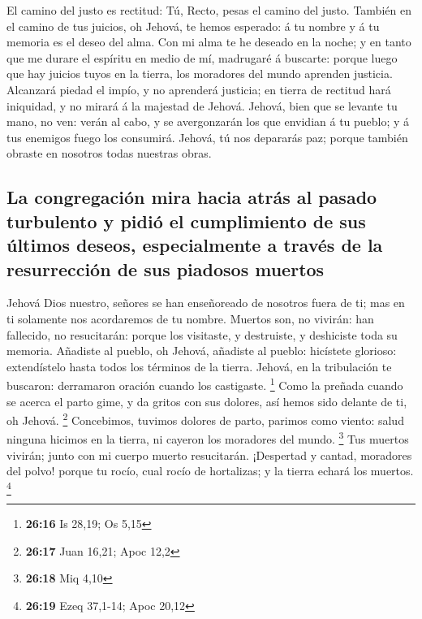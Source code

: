  El camino del justo es rectitud: Tú, Recto, pesas el
camino del justo.  También en el camino de tus juicios, oh
Jehová, te hemos esperado: á tu nombre y á tu memoria es el deseo del
alma.  Con mi alma te he deseado en la noche; y en tanto
que me durare el espíritu en medio de mí, madrugaré á buscarte: porque
luego que hay juicios tuyos en la tierra, los moradores del mundo
aprenden justicia.  Alcanzará piedad el impío, y no
aprenderá justicia; en tierra de rectitud hará iniquidad, y no mirará á
la majestad de Jehová.  Jehová, bien que se levante tu
mano, no ven: verán al cabo, y se avergonzarán los que envidian á tu
pueblo; y á tus enemigos fuego los consumirá.  Jehová, tú
nos depararás paz; porque también obraste en nosotros todas nuestras
obras.

\hypertarget{la-congregaciuxf3n-mira-hacia-atruxe1s-al-pasado-turbulento-y-pidiuxf3-el-cumplimiento-de-sus-uxfaltimos-deseos-especialmente-a-travuxe9s-de-la-resurrecciuxf3n-de-sus-piadosos-muertos}{%
\subsection{La congregación mira hacia atrás al pasado turbulento y
pidió el cumplimiento de sus últimos deseos, especialmente a través de
la resurrección de sus piadosos
muertos}\label{la-congregaciuxf3n-mira-hacia-atruxe1s-al-pasado-turbulento-y-pidiuxf3-el-cumplimiento-de-sus-uxfaltimos-deseos-especialmente-a-travuxe9s-de-la-resurrecciuxf3n-de-sus-piadosos-muertos}}

 Jehová Dios nuestro, señores se han enseñoreado de
nosotros fuera de ti; mas en ti solamente nos acordaremos de tu nombre.
 Muertos son, no vivirán: han fallecido, no resucitarán:
porque los visitaste, y destruiste, y deshiciste toda su memoria.
 Añadiste al pueblo, oh Jehová, añadiste al pueblo:
hicístete glorioso: extendístelo hasta todos los términos de la tierra.
 Jehová, en la tribulación te buscaron: derramaron
oración cuando los castigaste. \footnote{\textbf{26:16} Is 28,19; Os
  5,15}  Como la preñada cuando se acerca el parto gime,
y da gritos con sus dolores, así hemos sido delante de ti, oh Jehová.
\footnote{\textbf{26:17} Juan 16,21; Apoc 12,2} 
Concebimos, tuvimos dolores de parto, parimos como viento: salud ninguna
hicimos en la tierra, ni cayeron los moradores del mundo. \footnote{\textbf{26:18}
  Miq 4,10}  Tus muertos vivirán; junto con mi cuerpo
muerto resucitarán. ¡Despertad y cantad, moradores del polvo! porque tu
rocío, cual rocío de hortalizas; y la tierra echará los muertos.
\footnote{\textbf{26:19} Ezeq 37,1-14; Apoc 20,12}

